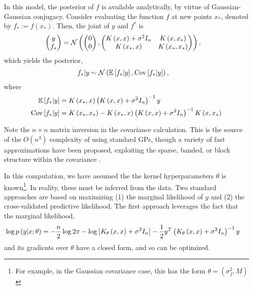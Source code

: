 \documentclass[14pt]{extreport}
\begin{document}
In this model, the posterior of $f$ is available analytically, by virtue of
Gaussian-Gaussian conjugacy. Consider evaluating the function $f$ at new points
$x_{\ast}$, denoted by $f_{\ast} := f\left(x_{\ast}\right)$. Then, the joint of
$y$ and $f^{\ast}$ is
\begin{align*}
  \begin{pmatrix}
    y \\ f_{\ast}
  \end{pmatrix} &= \mathcal{N}\left(
 \begin{pmatrix}
   0 \\ 0
 \end{pmatrix} ,
\begin{pmatrix}
  K\left(x, x\right) + \sigma^{2}I_{n} & K\left(x, x_{\ast}\right) \\
  K\left(x_{\ast}, x\right) & K\left(x_{\ast}, x_{\ast}\right)
\end{pmatrix}
  \right),
\end{align*}
which yields the posterior,
\begin{align*}
  f_{\ast} \vert y &\sim \mathcal{N}\left(\mathbb{E}\left[{f_{\ast} \vert y}\right], \mathrm{Cov}\left[{f_{\ast} \vert y}\right]\right),
\end{align*}
where
\begin{align*}
  \mathbb{E}\left[{f_{\ast} \vert y}\right] &= K\left(x_{\ast}, x\right)\left(K\left(x, x\right) + \sigma^{2}I_{n}\right)^{-1}y \\
  \mathrm{Cov}\left[{f_{\ast} \vert y}\right] &= K\left(x_{\ast}, x_{\ast}\right) - K\left(x_{\ast}, x\right)\left(K\left(x, x\right) + \sigma^{2}I_{n}\right)^{-1}K\left(x, x_{\ast}\right)
\end{align*}

Note the $n\times n$ matrix inversion in the covariance calculation. This is the
source of the $O\left(n^{3}\right)$ complexity of using standard GPs, though a
variety of fast approximations have been proposed, exploiting the sparse,
banded, or block structure within the covariance
\citep{quinonero2007approximation}.

In this computation, we have assumed the the kernel hyperparameters $\theta$ is
known\footnote{For example, in the Gaussian covariance case, this has the form
  $\theta = \left(\sigma_{f}^{2}, M\right)$}. In reality, these must be inferred
from the data. Two standard approaches are based on maximizing (1) the marginal
likelihood of $y$ and (2) the cross-validated predictive likelihood. The first
approach leverages the fact that the marginal likelihood,
\begin{align*}
\log p\left(y \vert x; \theta\right) &= -\frac{n}{2}\log 2\pi - \log\left|K_{\theta}\left(x, x\right) + \sigma^{2}I_{n}\right| - \frac{1}{2}y^{T}\left(K_{\theta}\left(x, x\right) + \sigma^{2}I_{n}\right)^{-1}y
\end{align*}
and its gradients over $\theta$ have a closed form, and so can be optimized.
\end{document}
